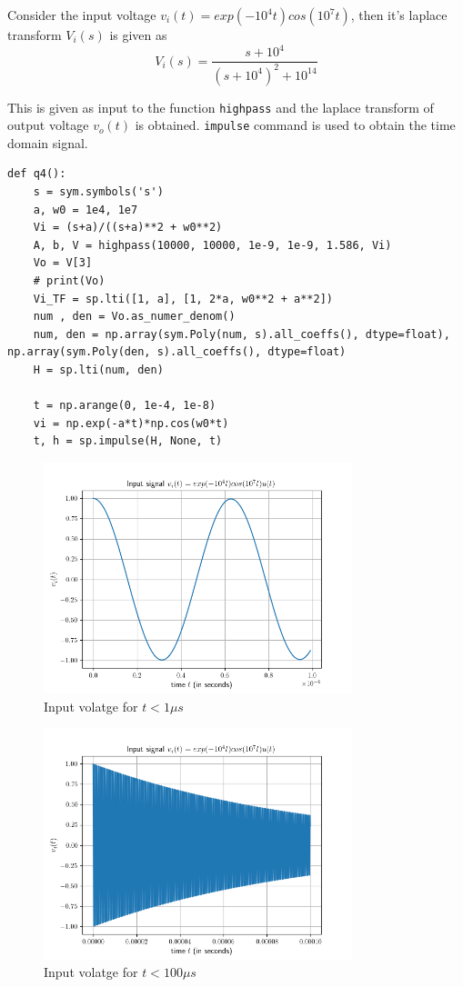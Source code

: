 \documentclass[12pt, a4paper]{article}
\begin{document}
Consider the input voltage $v_i(t) = exp(-10^4 t)cos(10^7 t)$, then it's laplace transform $V_i(s)$ is given as
\begin{equation*}
V_i(s) = \frac{s+10^4}{(s+10^4)^2 + 10^{14}}
\end{equation*}

This is given as input to the function \texttt{highpass} and the laplace transform of output voltage $v_o(t)$ is obtained. \texttt{impulse} command is used to obtain the time domain signal.

\begin{lstlisting}
def q4():
    s = sym.symbols('s')
    a, w0 = 1e4, 1e7
    Vi = (s+a)/((s+a)**2 + w0**2)
    A, b, V = highpass(10000, 10000, 1e-9, 1e-9, 1.586, Vi)
    Vo = V[3]
    # print(Vo)
    Vi_TF = sp.lti([1, a], [1, 2*a, w0**2 + a**2])
    num , den = Vo.as_numer_denom()
    num, den = np.array(sym.Poly(num, s).all_coeffs(), dtype=float), np.array(sym.Poly(den, s).all_coeffs(), dtype=float)
    H = sp.lti(num, den)

    t = np.arange(0, 1e-4, 1e-8)
    vi = np.exp(-a*t)*np.cos(w0*t)
    t, h = sp.impulse(H, None, t)
\end{lstlisting}

\begin{figure}[H]
\centering
\includegraphics[width=0.8\textwidth]{q4Input1.png}
\caption{Input volatge for $t < 1 \mu s$}
\end{figure}

\begin{figure}[H]
\centering
\includegraphics[width=0.8\textwidth]{q4Input2.png}
\caption{Input volatge for $t < 100 \mu s$}
\end{figure}
\end{document}
